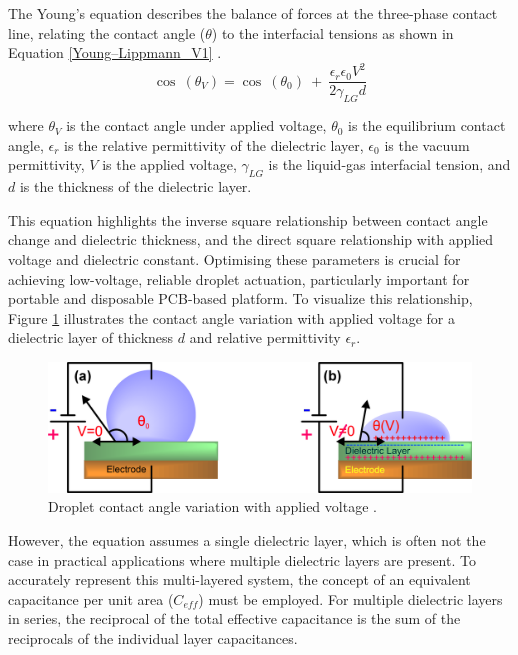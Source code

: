 \documentclass[9pt,a4paper,twocolumn,twoside]{tau-class/tau}
\begin{document}
The Young’s equation describes the balance of forces at the three-phase contact line, relating the contact angle ($\theta$) to the interfacial tensions as shown in Equation \ref{Young–Lippmann_V1} \cite{banerjeeDeterministicSplittingFluid2012,basuDevelopmentGrapheneOxide2021}.
\begin{equation}
\label{Young–Lippmann_V1}
\cos~(\theta_{V}) = \cos~(\theta_{0})~+~\frac{\epsilon_{r}\epsilon_{0}V^{2}}{2\gamma_{LG}d}
\end{equation}

\noindent where $\theta_{V}$ is the contact angle under applied voltage, $\theta_{0}$ is the equilibrium contact angle, $\epsilon_{r}$ is the relative permittivity of the dielectric layer, $\epsilon_{0}$ is the vacuum permittivity, $V$ is the applied voltage, $\gamma_{LG}$ is the liquid-gas interfacial tension, and $d$ is the thickness of the dielectric layer.

This equation highlights the inverse square relationship between contact angle change and dielectric thickness, and the direct square relationship with applied voltage and dielectric constant. Optimising these parameters is crucial for achieving low-voltage, reliable droplet actuation, particularly important for portable and disposable PCB-based platform. To visualize this relationship, Figure \ref{Young–Lippmann} illustrates the contact angle variation with applied voltage for a dielectric layer of thickness $d$ and relative permittivity $\epsilon_{r}$.
\begin{figure}[h!]
    \centering
    \includegraphics[width=\columnwidth]{ContactAngleWhenActuated.png}
    \caption{Droplet contact angle variation with applied voltage \cite{jainDesignFabricationCharacterization2017}.}
    \label{Young–Lippmann}
\end{figure}

However, the equation assumes a single dielectric layer, which is often not the case in practical applications where multiple dielectric layers are present. To accurately represent this multi-layered system, the concept of an equivalent capacitance per unit area ($C_{eff}$) must be employed. For multiple dielectric layers in series, the reciprocal of the total effective capacitance is the sum of the reciprocals of the individual layer capacitances.
\end{document}
